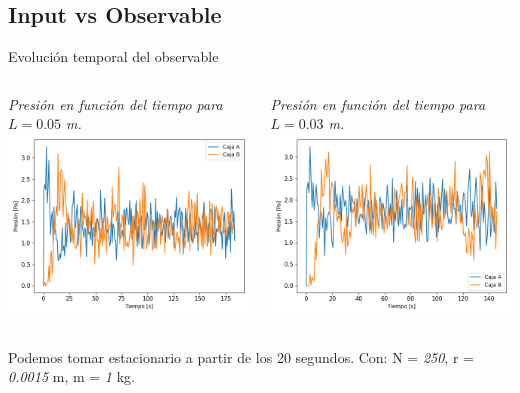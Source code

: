 \documentclass{beamer}
\begin{document}
\subsection{Input vs Observable}
\begin{frame}{Evolución temporal del observable}
  \begin{columns}
    \begin{column}{0.5\textwidth}
      \scriptsize \textit{Presión en función del tiempo para $L = \textit{0.05}$ m.}
      \includegraphics[width=\linewidth]{photoMaterial/PvT_05.png}
    \end{column}
    \begin{column}{0.5\textwidth}
      \scriptsize \textit{Presión en función del tiempo para $L = \textit{0.03}$ m.}
      \includegraphics[width=\linewidth]{photoMaterial/PvT_03.png}
    \end{column}
  \end{columns}
  \tiny Podemos tomar estacionario a partir de los 20 segundos.
  \tiny Con: N = \textit{250}, r = \textit{0.0015} m, m = \textit{1} kg.
\end{frame}
\end{document}
